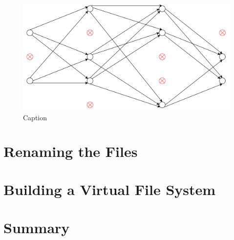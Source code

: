     \begin{figure}[H]
        \centering
        \includegraphics[scale=0.45]{Images/afterdrp.png}
        \caption{Caption}
        \label{fig:my_label}
    \end{figure}
    
    \section{Renaming the Files}
    
    \section{Building a Virtual File System}
    
    
    \section{Summary}
